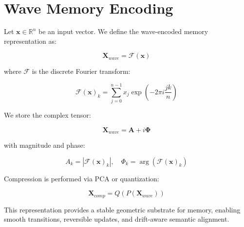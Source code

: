 \section{Wave Memory Encoding}

Let $\mathbf{x} \in \mathbb{R}^n$ be an input vector.  
We define the wave-encoded memory representation as:

\[
\mathbf{X}_{wave} = \mathcal{F}(\mathbf{x})
\]

where $\mathcal{F}$ is the discrete Fourier transform:

\[
\mathcal{F}(\mathbf{x})_k =
\sum_{j=0}^{n-1} x_j \exp\left(-2\pi i \frac{jk}{n}\right)
\]

We store the complex tensor:

\[
\mathbf{X}_{wave} = \mathbf{A} + i\mathbf{\Phi}
\]

with magnitude and phase:

\[
A_k = |\mathcal{F}(\mathbf{x})_k|, \quad
\Phi_k = \arg(\mathcal{F}(\mathbf{x})_k)
\]

Compression is performed via PCA or quantization:

\[
\mathbf{X}_{comp} = Q(P(\mathbf{X}_{wave}))
\]

This representation provides a stable geometric substrate for memory, enabling
smooth transitions, reversible updates, and drift-aware semantic alignment.
